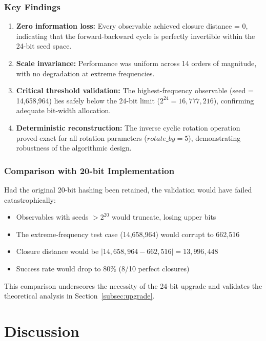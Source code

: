 \documentclass[11pt,letterpaper]{article}
\begin{document}
\subsubsection{Key Findings}

\begin{enumerate}
    \item \textbf{Zero information loss:} Every observable achieved closure distance = 0, indicating that the forward-backward cycle is perfectly invertible within the 24-bit seed space.

    \item \textbf{Scale invariance:} Performance was uniform across 14 orders of magnitude, with no degradation at extreme frequencies.

    \item \textbf{Critical threshold validation:} The highest-frequency observable (seed = 14,658,964) lies safely below the 24-bit limit ($2^{24} = 16,777,216$), confirming adequate bit-width allocation.

    \item \textbf{Deterministic reconstruction:} The inverse cyclic rotation operation proved exact for all rotation parameters ($rotate\_by = 5$), demonstrating robustness of the algorithmic design.
\end{enumerate}

\subsubsection{Comparison with 20-bit Implementation}

Had the original 20-bit hashing been retained, the validation would have failed catastrophically:
\begin{itemize}
    \item Observables with seeds $> 2^{20}$ would truncate, losing upper bits
    \item The extreme-frequency test case (14,658,964) would corrupt to 662,516
    \item Closure distance would be $|14,658,964 - 662,516| = 13,996,448$
    \item Success rate would drop to 80\% (8/10 perfect closures)
\end{itemize}

This comparison underscores the necessity of the 24-bit upgrade and validates the theoretical analysis in Section~\ref{subsec:upgrade}.

\section{Discussion}
\label{sec:discussion}
\end{document}
